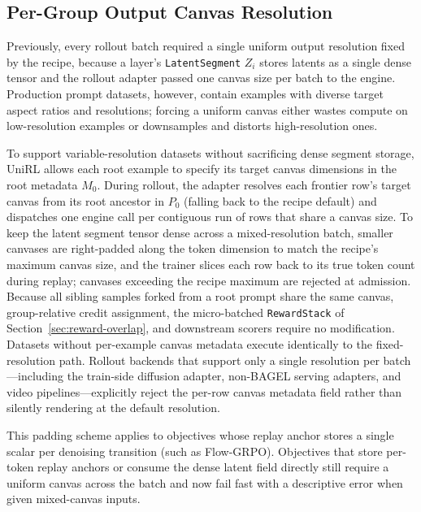 \subsection{Per-Group Output Canvas Resolution}
\label{sec:fidelity-canvas}

Previously, every rollout batch required a single uniform output resolution fixed by the recipe, because a layer's \texttt{LatentSegment} $Z_i$ stores latents as a single dense tensor and the rollout adapter passed one canvas size per batch to the engine.
Production prompt datasets, however, contain examples with diverse target aspect ratios and resolutions; forcing a uniform canvas either wastes compute on low-resolution examples or downsamples and distorts high-resolution ones.

To support variable-resolution datasets without sacrificing dense segment storage, UniRL allows each root example to specify its target canvas dimensions in the root metadata $M_0$.
During rollout, the adapter resolves each frontier row's target canvas from its root ancestor in $P_0$ (falling back to the recipe default) and dispatches one engine call per contiguous run of rows that share a canvas size.
To keep the latent segment tensor dense across a mixed-resolution batch, smaller canvases are right-padded along the token dimension to match the recipe's maximum canvas size, and the trainer slices each row back to its true token count during replay; canvases exceeding the recipe maximum are rejected at admission.
Because all sibling samples forked from a root prompt share the same canvas, group-relative credit assignment, the micro-batched \texttt{RewardStack} of Section~\ref{sec:reward-overlap}, and downstream scorers require no modification.
Datasets without per-example canvas metadata execute identically to the fixed-resolution path.
Rollout backends that support only a single resolution per batch---including the train-side diffusion adapter, non-BAGEL serving adapters, and video pipelines---explicitly reject the per-row canvas metadata field rather than silently rendering at the default resolution.

This padding scheme applies to objectives whose replay anchor stores a single scalar per denoising transition (such as Flow-GRPO).
Objectives that store per-token replay anchors or consume the dense latent field directly still require a uniform canvas across the batch and now fail fast with a descriptive error when given mixed-canvas inputs.

\begin{table}[H]
\caption{Generation time (seconds) for one prompt group of four sibling samples across three output canvas resolutions on a single H20 rank, for image-to-image editing (\texttt{it2i}, which additionally encodes a $512\times512$ source image) and text-to-image generation (\texttt{t2i}).}
\label{tab:fidelity-canvas}
\centering
\small

\end{table}

